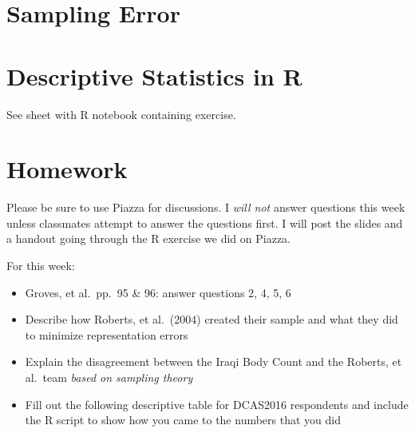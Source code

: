 \documentclass[11pt]{lecturenotes}
\begin{document}
\clearpage
\section[25]{Sampling Error}
\clearpage

\section[20]{Descriptive Statistics in R}

See sheet with R notebook containing exercise.










\section[5]{Homework}
Please be sure to use Piazza for discussions. I \emph{will not} answer questions this week unless classmates attempt to answer the questions first. I will post the slides and a handout going through the R exercise we did on Piazza. 

For this week: 
\begin{itemize}
\item Groves, et al.\ pp.\ 95 \& 96: answer questions 2, 4, 5, 6
\item Describe how Roberts, et al.\ (2004) created their sample and what they did to minimize representation errors
\item Explain the disagreement between the Iraqi Body Count and the Roberts, et al.\ team \emph{based on sampling theory}
\item Fill out the following descriptive table for DCAS2016 respondents and include the R script to show how you came to the numbers that you did
\end{itemize}
\end{document}
